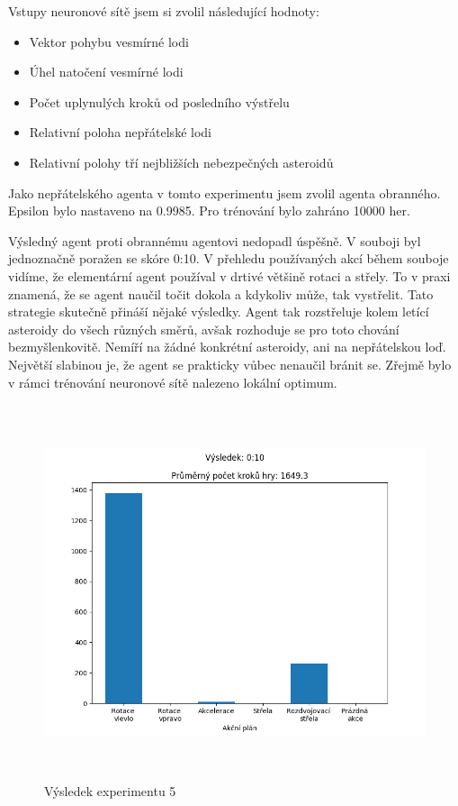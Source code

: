 \par
Vstupy neuronové sítě jsem si zvolil následující hodnoty:
\begin{itemize}
    \item Vektor pohybu vesmírné lodi
    \item Úhel natočení vesmírné lodi
    \item Počet uplynulých kroků od posledního výstřelu
    \item Relativní poloha nepřátelské lodi
    \item Relativní polohy tří nejbližších nebezpečných asteroidů
\end{itemize}

Jako nepřátelského agenta v tomto experimentu jsem zvolil agenta obranného.
Epsilon bylo nastaveno na 0.9985. Pro trénování bylo zahráno 10000 her.




Výsledný agent proti obrannému agentovi nedopadl úspěšně. V souboji byl jednoznačně poražen se skóre 0:10.
V přehledu používaných akcí během souboje vidíme, že elementární agent používal v drtivé většině rotaci a střely.
To v praxi znamená, že se agent naučil točit dokola a kdykoliv může, tak vystřelit. Tato strategie skutečně přináší nějaké výsledky.
Agent tak rozstřeluje kolem letící asteroidy do všech různých směrů, avšak rozhoduje se pro toto chování bezmyšlenkovitě. Nemíří na žádné konkrétní asteroidy, ani na nepřátelskou loď.
Největší slabinou je, že agent se prakticky vůbec nenaučil bránit se. Zřejmě bylo v rámci trénování neuronové sítě nalezeno lokální optimum.

\begin{figure}[p]\centering
\includegraphics[width=145mm, height=110mm]{./Obrazky/Experiment05Results.png}
\caption{Výsledek experimentu 5}
\label{obr06:Výsledek experimentu 05}
\end{figure}
    



